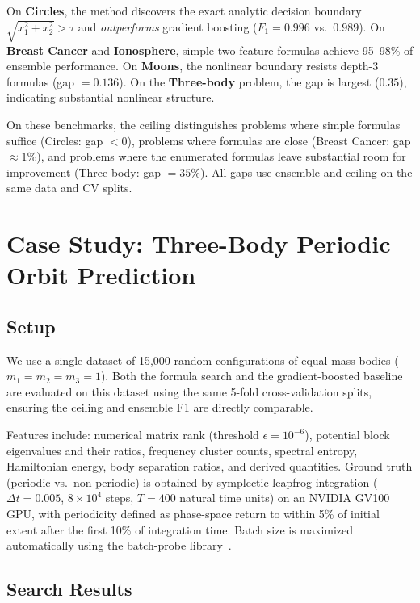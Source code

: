 \documentclass[journal]{IEEEtran}
\begin{document}
On \textbf{Circles}, the method discovers the exact analytic decision
boundary $\sqrt{x_1^2 + x_2^2} > \tau$ and \emph{outperforms} gradient
boosting ($F_1 = 0.996$ vs.\ $0.989$). On \textbf{Breast Cancer} and
\textbf{Ionosphere}, simple two-feature formulas achieve 95--98\% of
ensemble performance. On \textbf{Moons}, the nonlinear boundary resists
depth-3 formulas (gap $= 0.136$). On the \textbf{Three-body} problem,
the gap is largest ($0.35$), indicating substantial nonlinear structure.

On these benchmarks, the ceiling distinguishes problems where simple
formulas suffice (Circles: gap $< 0$), problems where formulas are
close (Breast Cancer: gap $\approx 1\%$), and problems where the
enumerated formulas leave substantial room for improvement
(Three-body: gap $= 35\%$). All gaps use ensemble and ceiling
on the same data and CV splits.

\section{Case Study: Three-Body Periodic Orbit Prediction}

\subsection{Setup}

We use a single dataset of 15{,}000 random configurations of
equal-mass bodies ($m_1 = m_2 = m_3 = 1$). Both the formula search
and the gradient-boosted baseline are evaluated on this dataset using
the same 5-fold cross-validation splits, ensuring the ceiling and
ensemble F1 are directly comparable.

Features include: numerical matrix rank (threshold $\epsilon = 10^{-6}$),
potential block eigenvalues and their ratios, frequency cluster counts,
spectral entropy, Hamiltonian energy, body separation ratios, and
derived quantities. Ground truth (periodic vs.\ non-periodic) is
obtained by symplectic leapfrog integration ($\Delta t = 0.005$,
$8 \times 10^4$ steps, $T = 400$ natural time units) on an NVIDIA
GV100 GPU, with periodicity defined as phase-space return to within
5\% of initial extent after the first 10\% of integration time.
Batch size is maximized automatically using the batch-probe
library~\cite{batchprobe}.

\subsection{Search Results}
\end{document}
